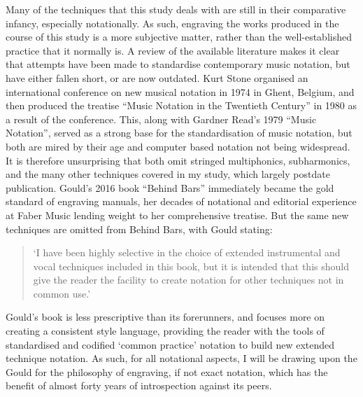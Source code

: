 Many of the techniques that this study deals with are still in their comparative infancy, especially notationally. As such, engraving the works produced in the course of this study is a more subjective matter, rather than the well-established practice that it normally is. A review of the available literature makes it clear that attempts have been made to standardise contemporary music notation, but have either fallen short, or are now outdated. Kurt Stone organised an international conference on new musical notation in 1974 in Ghent, Belgium, and then produced the treatise “Music Notation in the Twentieth Century” in 1980 as a result of the conference.\autocite[xiii]{stoneMusicNotationTwentieth1980} This, along with Gardner Read’s 1979 “Music Notation”, served as a strong base for the standardisation of music notation, but both are mired by their age and computer based notation not being widespread.\autocite{readCompendiumModernInstrumental1993} It is therefore unsurprising that both omit stringed multiphonics, subharmonics, and the many other techniques covered in my study, which largely postdate publication. Gould’s 2016 book “Behind Bars” immediately became the gold standard of engraving manuals, her decades of notational and editorial experience at Faber Music lending weight to her comprehensive treatise. But the same new techniques are omitted from Behind Bars, with Gould stating: 
\begin{quotation}
    ‘I have been highly selective in the choice of extended instrumental and vocal techniques included in this book, but it is intended that this should give the reader the facility to create notation for other techniques not in common use.’\autocite[iii]{gouldBars2011} 
\end{quotation}
Gould’s book is less prescriptive than its forerunners, and focuses more on creating a consistent style language, providing the reader with the tools of standardised and codified ‘common practice’ notation to build new extended technique notation. As such, for all notational aspects, I will be drawing upon the Gould for the philosophy of engraving, if not exact notation, which has the benefit of almost forty years of introspection against its peers.

